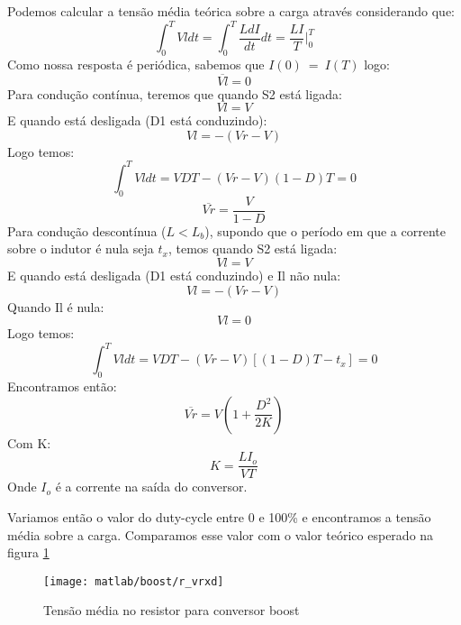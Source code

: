 \documentclass{article}
\begin{document}
Podemos calcular a tensão média teórica sobre a carga através considerando que:
\begin{equation}
\int_{0}^{T}Vl dt = \int_{0}^{T}\frac{LdI}{dt} dt = \frac{LI}{T}\bigg\rvert_0^T
\end{equation}
Como nossa resposta é periódica, sabemos que $I(0)\ =\ I(T)$ logo:
\begin{equation}
\overline{Vl} = 0
\end{equation}
Para condução contínua, teremos que quando S2 está ligada:
\begin{equation}
	Vl = V
\end{equation}
E quando está desligada (D1 está conduzindo):
\begin{equation}
	Vl = -(Vr - V)
\end{equation}
Logo temos:
\begin{equation}
	\int_{0}^{T}Vl dt = VDT - (Vr - V)(1 - D)T = 0
\end{equation}
\begin{equation}
\overline{Vr} = \frac{V}{1 - D}
\end{equation}
Para condução descontínua ($L < L_b$), supondo que o período em que a corrente sobre o indutor é nula seja $t_x$, temos quando S2 está ligada:
\begin{equation}
Vl = V
\end{equation}
E quando está desligada (D1 está conduzindo) e Il não nula:
\begin{equation}
Vl = -(Vr - V)
\end{equation}
Quando Il é nula:
\begin{equation}
Vl = 0
\end{equation}
Logo temos:
\begin{equation}
\int_{0}^{T}Vl dt = VDT - (Vr - V)[(1 - D)T - t_x] = 0
\end{equation}
Encontramos então:
\begin{equation}
\overline{Vr} = V(1 + \frac{D^2}{2K})
\end{equation}
Com K:
\begin{equation}
	K = \frac{LI_o}{VT}
\end{equation}
Onde $I_o$ é a corrente na saída do conversor.

Variamos então o valor do duty-cycle entre 0 e 100\% e encontramos a tensão média sobre a carga. Comparamos esse valor com o valor teórico esperado na figura \ref{fig:bovrxd}
\begin{figure}[H]
	\centering
	\texttt{[image: matlab/boost/r\_vrxd]}
	\caption{Tensão média no resistor para conversor boost}
	\label{fig:bovrxd}
\end{figure}
\end{document}
